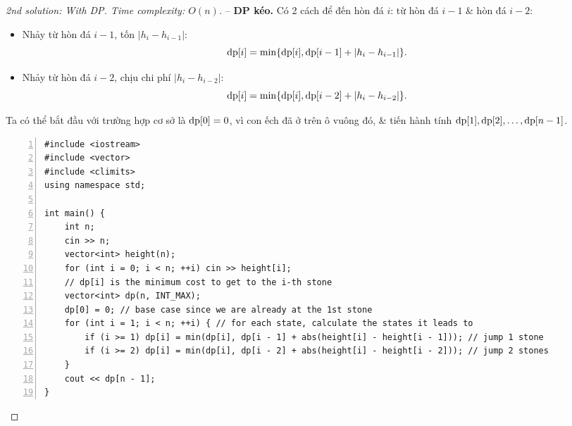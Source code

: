 \documentclass{article}
\begin{document}
\begin{proof}[2nd solution: With DP. Time complexity: $O(n)$]
    -- {\bf DP kéo.} Có 2 cách để đến hòn đá $i$: từ hòn đá $i - 1$ \& hòn đá $i - 2$:
    \begin{itemize}
        \item Nhảy từ hòn đá $i - 1$, tốn $|h_i - h_{i-1}|$:
        \begin{equation*}
            {\rm dp}[i] = \min\{{\rm dp}[i],{\rm dp}[i - 1] + |h_i - h_{i-1}|\}.
        \end{equation*}
        \item Nhảy từ hòn đá $i - 2$, chịu chi phí $|h_i - h_{i-2}|$:
        \begin{equation*}
            {\rm dp}[i] = \min\{{\rm dp}[i],{\rm dp}[i - 2] + |h_i - h_{i-2}|\}.
        \end{equation*}
    \end{itemize}
    Ta có thể bắt đầu với trường hợp cơ sở là ${\rm dp}[0] = 0$, vì con ếch đã ở trên ô vuông đó, \& tiến hành tính ${\rm dp}[1],{\rm dp}[2],\ldots,{\rm dp}[n - 1]$.
    \begin{Verbatim}[numbers=left,xleftmargin=5mm]
#include <iostream>
#include <vector>
#include <climits>
using namespace std;

int main() {
    int n;
    cin >> n;
    vector<int> height(n);
    for (int i = 0; i < n; ++i) cin >> height[i];
    // dp[i] is the minimum cost to get to the i-th stone
    vector<int> dp(n, INT_MAX);
    dp[0] = 0; // base case since we are already at the 1st stone
    for (int i = 1; i < n; ++i) { // for each state, calculate the states it leads to
        if (i >= 1) dp[i] = min(dp[i], dp[i - 1] + abs(height[i] - height[i - 1])); // jump 1 stone
        if (i >= 2) dp[i] = min(dp[i], dp[i - 2] + abs(height[i] - height[i - 2])); // jump 2 stones
    }
    cout << dp[n - 1];
}
    \end{Verbatim}
\end{proof}
\end{document}
